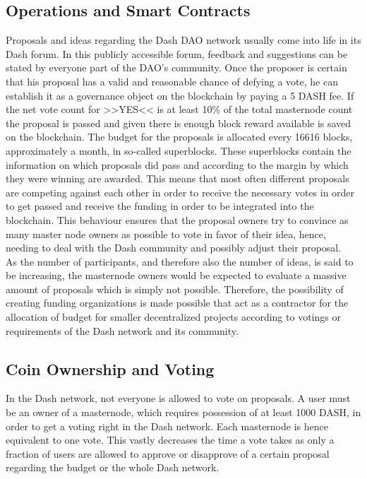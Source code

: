 \documentclass[a4paper,12pt]{report}
\begin{document}
	    \subsection{Operations and Smart Contracts}
	    \startsubsection
	        Proposals and ideas regarding the Dash DAO network usually come into life in its Dash forum. In this publicly accessible forum, feedback and suggestions can be stated by everyone part of the DAO's community. Once the proposer is certain that his proposal has a valid and reasonable chance of defying a vote, he can establish it as a governance object on the blockchain by paying a 5 DASH fee. If the net vote count for >>YES<< is at least 10\% of the total masternode count the proposal is passed and given there is enough block reward available is saved on the blockchain. The budget for the proposals is allocated every 16616 blocks, approximately a month, in so-called superblocks. These superblocks contain the information on which proposals did pass and according to the margin by which they were winning are awarded. This means that most often different proposals are competing against each other in order to receive the necessary votes in order to get passed and receive the funding in order to be integrated into the blockchain. This behaviour ensures that the proposal owners try to convince as many master node owners as possible to vote in favor of their idea, hence, needing to deal with the Dash community and possibly adjust their proposal. \\
	        As the number of participants, and therefore also the number of ideas, is said to be increasing, the masternode owners would be expected to evaluate a massive amount of proposals which is simply not possible. Therefore, the possibility of creating funding organizations is made possible that act as a contractor for the allocation of budget for smaller decentralized projects according to votings or requirements of the Dash network and its community.
	    \closesection
	    \subsection{Coin Ownership and Voting}
	    \startsubsection
	        In the Dash network, not everyone is allowed to vote on proposals. A user must be an owner of a masternode, which requires possession of at least 1000 DASH, in order to get a voting right in the Dash network. Each masternode is hence equivalent to one vote. This vastly decreases the time a vote takes as only a fraction of users are allowed to approve or disapprove of a certain proposal regarding the budget or the whole Dash network.
	    \closesection
	\closesection
	
\end{document}
